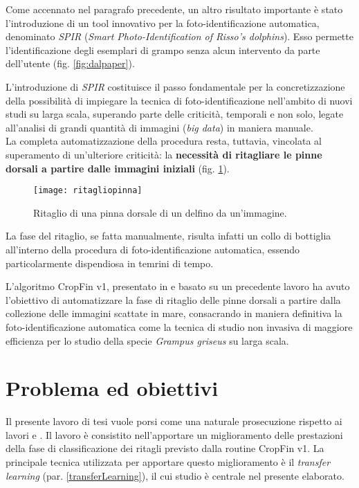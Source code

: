 Come accennato nel paragrafo precedente, un altro risultato importante è stato l'introduzione di un tool innovativo per la foto-identificazione automatica, denominato \textit{SPIR} (\textit{Smart Photo-Identification of Risso's dolphins}). Esso permette l’identificazione degli esemplari di grampo senza alcun intervento da parte dell’utente (fig. \ref{fig:dalpaper}).

L'introduzione di \textit{SPIR} costituisce il passo fondamentale per la concretizzazione della possibilità di impiegare la tecnica di foto-identificazione nell'ambito di nuovi studi su larga scala, superando parte delle criticità, temporali e non solo, legate all'analisi di grandi quantità di immagini (\textit{big data}) in maniera manuale.\\

La completa automatizzazione della procedura resta, tuttavia, vincolata al superamento di un'ulteriore criticità: la \textbf{necessità di ritagliare le pinne dorsali a partire dalle immagini iniziali} (fig. \ref{fig:ritagliopinna}).

\begin{figure}[h!]
	\centering
	\texttt{[image: ritagliopinna]}
	\caption{Ritaglio di una pinna dorsale di un delfino da un'immagine.}
	\label{fig:ritagliopinna}
\end{figure}

La fase del ritaglio, se fatta manualmente, risulta infatti un collo di bottiglia all'interno della procedura di foto-identificazione automatica, essendo particolarmente dispendiosa in temrini di tempo.

L'algoritmo CropFin v1, presentato in \cite{gianvito} e basato su un precedente lavoro \cite{flavio} ha avuto l'obiettivo di automatizzare la fase di ritaglio delle pinne dorsali a partire dalla collezione delle immagini scattate in mare, consacrando in maniera definitiva la foto-identificazione automatica come la tecnica di studio non invasiva di maggiore efficienza per lo studio della specie \textit{Grampus griseus} su larga scala.\\

\section{Problema ed obiettivi}
Il presente lavoro di tesi vuole porsi come una naturale prosecuzione rispetto ai lavori \cite{gianvito} e \cite{flavio}.
Il lavoro è consistito nell'apportare un miglioramento delle prestazioni della fase di classificazione dei ritagli previsto dalla routine CropFin v1.
La principale tecnica utilizzata per apportare questo miglioramento è il \textit{transfer learning} (par. \ref{transferLearning}), il cui studio è centrale nel presente elaborato.

